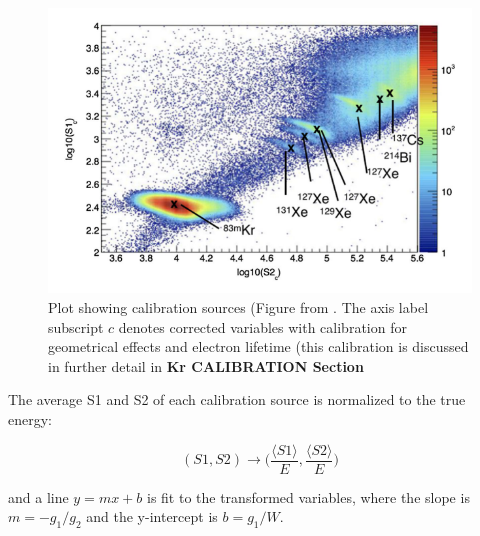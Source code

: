 \begin{figure}[htbp]
\begin{center}
\includegraphics[width=\halffig]{figures/lux/calibration_sources.png}
\caption{Plot showing calibration sources (Figure from \cite{LUX:Run03Comprehensive}. The axis label subscript $c$ denotes corrected variables with calibration for geometrical effects and electron lifetime (this calibration is discussed in further detail in \textbf{ Kr CALIBRATION Section} }
\label{fig:calib_sources}
\end{center}
\end{figure}

The average S1 and S2 of each calibration source is normalized to the true energy:

\begin{equation}
(S1, S2) \longrightarrow \Big(\frac{\langle S1 \rangle}{E}, \frac{\langle S2 \rangle}{E}\Big)
\end{equation}

and a line $y = mx + b$ is fit to the transformed variables, where the slope is $m = -g_{1} / g_{2}$ and the y-intercept is $b = g_{1} / W$. 


